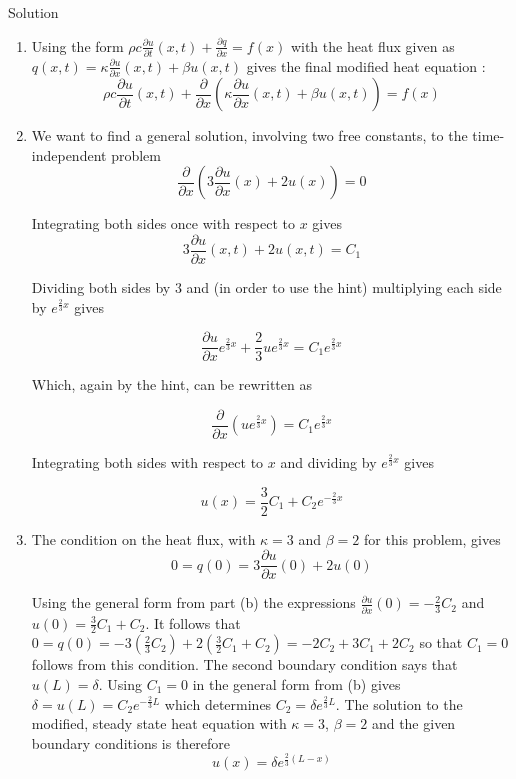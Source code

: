 \begin{center} Solution \end{center}
\begin{enumerate}
\item Using the form $\rho c \frac{\partial u}{\partial t} (x,t) + \frac{\partial q}{\partial x} = f(x)$ with the heat flux given as $q(x,t) = \kappa\frac{\partial u}{\partial x}(x,t) + \beta u(x,t)$ gives the final modified heat equation :
 \[
\rho c \frac{\partial u}{\partial t} (x,t) + \frac{\partial}{\partial x}\left(\kappa\frac{\partial u}{\partial x}(x,t) + \beta u(x,t)\right) = f(x)
\]


\item We want to find a general solution, involving two free constants, to the time-independent problem 
 \[
\frac{\partial}{\partial x}\left(3\frac{\partial u}{\partial x}(x) + 2 u(x)\right) = 0
\]

Integrating both sides once with respect to $x$ gives 
\[
3\frac{\partial u}{\partial x}(x,t) + 2 u(x,t) = C_1
\]

Dividing both sides by $3$ and (in order to use the hint) multiplying each side by $e^{\frac{2}{3}x}$ gives 

\[
\frac{\partial u}{\partial x}e^{\frac{2}{3}x} + \frac{2}{3} u e^{\frac{2}{3}x} = C_1 e^{\frac{2}{3}x}
\]

Which, again by the hint, can be rewritten as

\[
\frac{\partial}{\partial x}\left(  u e^{\frac{2}{3}x} \right) = C_1 e^{\frac{2}{3}x}
\]

Integrating both sides with respect to $x$ and dividing by $e^{\frac{2}{3}x}$ gives

\[
u(x) = \frac{3}{2}C_1 + C_2 e^{-\frac{2}{3} x}
\]

\item The condition on the heat flux, with $\kappa = 3$ and $\beta = 2$ for this problem, gives 
\[
0 = q(0) = 3\frac{\partial u}{\partial x}(0) + 2 u(0) 
\] 

Using the general form from part (b) the expressions $\frac{\partial u}{\partial x}(0) = - \frac{2}{3}C_2 $ and $u(0) = \frac{3}{2} C_1 + C_2$.  It follows that $0 = q(0) = -3\left(\frac{2}{3}C_2\right) + 2\left(\frac{3}{2} C_1 + C_2\right) = -2 C_2 + 3 C_1 + 2 C_2$ so that $C_1 = 0$ follows from this condition.  The second boundary condition says that $u(L) = \delta$.  Using $C_1 = 0$ in the general form from (b) gives $\delta = u(L) = C_2 e^{-\frac{2}{3}L}$ which determines $C_2 = \delta e^{\frac{2}{3}L}$.  The solution to the modified, steady state heat equation with $\kappa=3$, $\beta = 2$ and the given boundary conditions is therefore
\[
u(x) = \delta e^{\frac{2}{3}\left( L-x\right)}
\]



\end{enumerate}